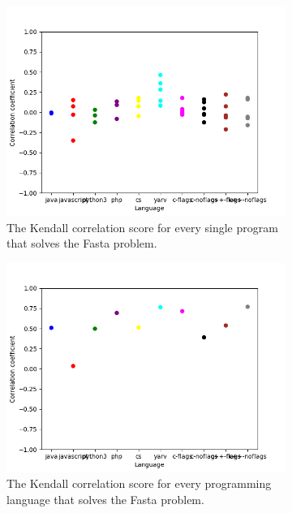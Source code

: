 \begin{figure}[h]
    \begin{subfigure}[b]{0.45\textwidth}
        \centering
        \includegraphics[width=1.1\textwidth]{graphs/kendall_Fasta.png}
        \caption{The Kendall correlation score for every single program that solves the Fasta problem.}
        \label{fig:corr-example}
    \end{subfigure}
    \hfill        
    \begin{subfigure}[b]{0.45\textwidth}
        \centering
        \includegraphics[width=1.1\textwidth]{graphs/kendall-lang_Fasta.png}
        \caption{The Kendall correlation score for every programming language that solves the Fasta problem.}
        \label{fig:corr-lang-example}
    \end{subfigure}
    \caption{}
    \label{fig:corr}
\end{figure}

